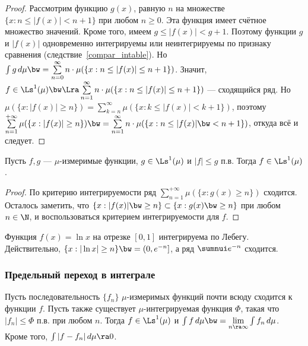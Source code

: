 \documentclass[10pt]{article}
\begin{document}
\begin{proof}
Рассмотрим функцию $g(x)$, равную $n$ на множестве $\{x:n\le
|f(x)|<n+1\}$ при любом $n\ge0$. Эта функция имеет счётное множество
значений. Кроме того, имеем $g\le|f(x)|< g+1$. Поэтому функции $g$ и
$|f(x)|$ одновременно интегрируемы или неинтегрируемы по признаку
сравнения (следствие~\ref{compar_intable}). Но $\int g\,d\mu\bw
=\sum\limits_{n=0}^{\infty}n\cdot\mu(\{x:n\le |f(x)|\le n+1\})$.
Значит, $f\in \Ls^1(\mu) \bw\Lra \sum\limits_{n=1}^\infty
n\cdot\mu(\{x:n\le |f(x)|\le n+1\})$ --- сходящийся ряд. Но
$\mu(\{x:|f(x)|\ge
n\})=\sum\limits_{k=n}^\infty\mu(\{x:k\le|f(x)|<k+1\})$, поэтому
$\sum\limits_{n=1}^{+\infty}\mu(\{x:|f(x)|\ge n\})\bw
=\sum\limits_{n=1}^\infty n\cdot\mu(\{x:n\le |f(x)|\bw < n+1\})$,
откуда всё и следует.
\end{proof}

\begin{imp}\label{crit_Weierst}
Пусть $f,g$ --- $\mu$-измеримые функции, $g\in \Ls^1(\mu)$ и $|f|\le
g$ п.в. Тогда $f\in \Ls^1(\mu)$.
\end{imp}
\begin{proof}
По критерию интегрируемости ряд
$\sum\limits_{n=1}^{+\infty}\mu(\{x:g(x)\ge n\})$ сходится. Осталось
заметить, что $\{x:|f(x)|\bw \ge n\}\subset\{x:g(x)\bw \ge n\}$ при
любом $n\in\N$, и воспользоваться критерием интегрируемости для $f$.
\end{proof}

\begin{ex}
Функция $f(x)=\ln x$ на отрезке $[0,1]$ интегрируема по Лебегу.
Действительно, $\{x:|\ln x|\ge n\}\bw =(0, e^{-n}]$, а ряд $\sumnui
e^{-n}$ сходится.
\end{ex}

\subsubsection{Предельный переход в интеграле}

\begin{theorem}[Лебег]
Пусть последовательность $\{f_n\}$ $\mu$-измеримых функций почти
всюду сходится к функции $f$. Пусть также существует
$\mu$-интегрируемая функция $\Phi$, такая что $|f_n|\le\Phi$ п.в.
при любом $n$. Тогда $f\in \Ls^1(\mu)$ и $\int f\,d\mu\bw
=\lim\limits_{n\ra\infty}\int f_n\,d\mu$. Кроме того,
$\int|f-f_n|\,d\mu\ra0$.
\end{theorem}
\end{document}
